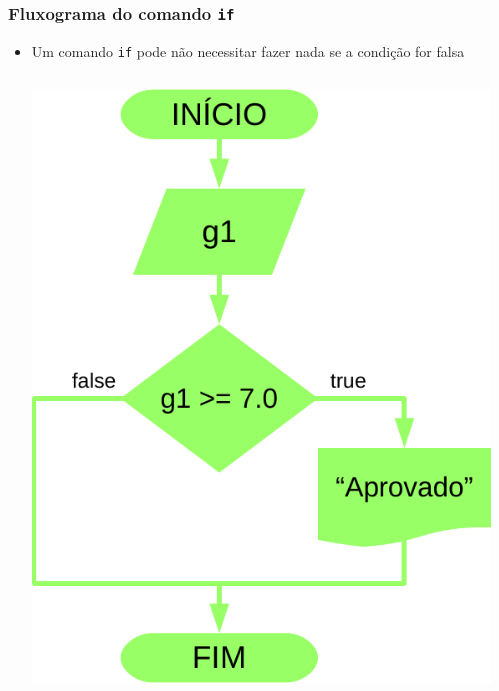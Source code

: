\documentclass[xcolor={dvipsnames,table},aspectratio=169]{beamer}
\begin{document}
\begin{frame}[fragile]\frametitle{Fluxograma do comando \texttt{if}}
\begin{itemize}
	\item Um comando \texttt{if} pode não necessitar fazer nada se a condição for falsa
\begin{columns}
\begin{column}{0.4\textwidth}
	\begin{center}
	\includegraphics[height=0.6\paperheight]{pucrs-ep-fprog-unidade_03-decisoes-laminas-fluxograma_if.png}
	\end{center}
\end{column}
\begin{column}{0.6\textwidth}
	\scriptsize{\inputminted[bgcolor=cyan!10]{java}{src/Aprovado.java}}
\end{column}
\end{columns}
\end{itemize}
\end{frame}
\end{document}
